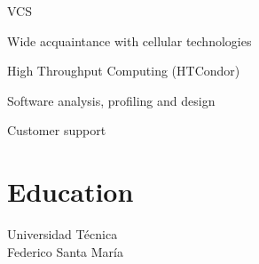 \documentclass[letterpaper]{cvitae}
\begin{document}
\begin{minipage}[t]{0.33\textwidth}
{VCS}

{Wide acquaintance with cellular technologies}

{High Throughput Computing (HTCondor)}


{Software analysis, profiling and design}


Customer support


\sectionspace

\section{Education}
{Universidad Técnica \\ Federico Santa María}

\end{minipage} %
\end{document}
